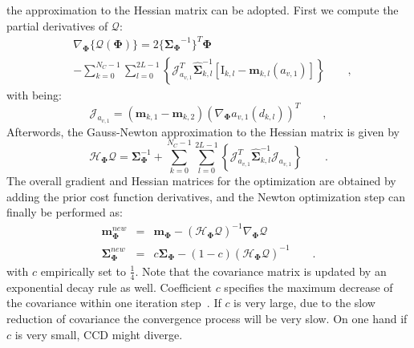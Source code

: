 \documentclass[conference]{IEEEtran}
\begin{document}
the approximation to the Hessian matrix can be adopted. First we
compute the partial derivatives of $\mathcal{Q}$:
\begin{equation}
\label{eq:partcost}
\begin{aligned}
&\nabla_{\mathbf{\Phi}}\{{\mathcal{Q}(\mathbf{\Phi})}\} =
2\{{\mathbf{\Sigma}_{\mathbf{\Phi}}}^{-1}\}^{T}{\mathbf{\Phi}}\\ 
&- \sum_{k = 0}^{N_{C}-1} \sum_{l=0}^{2L-1} \left\{\mathcal{J}_{a_{v,1}}^T\hat{\mathbf{\Sigma}}_{k,l}^{-1}\left[\mathrm{I}_{k,l}-\hat{\mathbf{m}}_{k,l}(a_{v,1})\right]\right\}\qquad,
\end{aligned}
\end{equation}
with being:
\begin{equation}
  \label{eq:jocob}
  \mathcal{J}_{a_{v,1}} = \left( \mathbf{m}_{k,1} -\mathbf{m}_{k,2} \right)(\nabla_{\mathbf{\Phi}} a_{v,1}(d_{k,l}))^T\qquad,
\end{equation}
Afterwords, the Gauss-Newton approximation to the Hessian
matrix is given by
\begin{equation}
  \label{eq:hessian}
  \mathcal{H}_{\mathbf{\Phi}} \mathcal{Q}  =
  \mathbf{\Sigma}_{\mathbf{\Phi}}^{-1} + \sum_{k = 0}^{N_{C}-1}
  \sum_{l=0}^{2L-1} \left\{\mathcal{J}_{a_{v,1}}^T\hat{\mathbf{\Sigma}}_{k,l}^{-1}\mathcal{J}_{a_{v,1}}\right\}\qquad.
\end{equation}
The overall gradient and Hessian matrices for the optimization
are obtained by adding the prior cost function
derivatives, and the Newton optimization step can finally be
performed as:
\begin{eqnarray}
\label{eq:newton}
  \mathbf{m}_{\mathbf{\Phi}}^{new} & = &
  \mathbf{m}_{\mathbf{\Phi}} - (\mathcal{H}_{\mathbf{\Phi}}
  \mathcal{Q})^{-1} \nabla_{\mathbf{\Phi}} \mathcal{Q} \nonumber \\
  \mathbf{\Sigma}_{\mathbf{\Phi}}^{new} & = &
  c\mathbf{\Sigma}_{\mathbf{\Phi}} - (1-c)(\mathcal{H}_{\mathbf{\Phi}}
  \mathcal{Q})^{-1}\qquad.
\end{eqnarray}
with $c$ empirically set to $\frac{1}{4}$. Note that the covariance
matrix is updated by an exponential decay rule as well. Coefficient $c$ specifies the
maximum decrease of the covariance within one iteration
step~\cite{hanek2004contracting}. If $c$ is very large, due to the slow reduction of covariance the
convergence process will be very slow. On one hand if $c$ is
very small, CCD might diverge.


\end{document}
